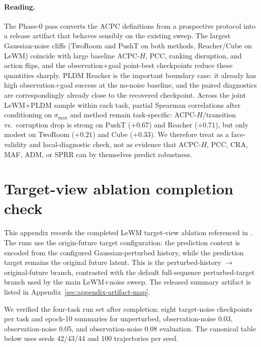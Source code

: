 \documentclass[10pt]{article}
\newcommand{\stdmax}{\ensuremath{\sigma_{\max}}}
\begin{document}
\paragraph{Reading.} The Phase-0 pass converts the ACPC definitions from a prospective protocol into a release artifact that behaves sensibly on the existing sweep. The largest Gaussian-noise cliffs (TwoRoom and PushT on both methods, Reacher/Cube on LeWM) coincide with large baseline ACPC-$H$, PCC, ranking disruption, and action flips, and the observation+goal point-best checkpoints reduce these quantities sharply. PLDM Reacher is the important boundary case: it already has high observation+goal success at the no-noise baseline, and the paired diagnostics are correspondingly already close to the recovered checkpoint. Across the joint LeWM+PLDM sample within each task, partial Spearman correlations after conditioning on \stdmax{} and method remain task-specific: ACPC-$H$/transition vs.\ corruption drop is strong on PushT ($+0.67$) and Reacher ($+0.71$), but only modest on TwoRoom ($+0.21$) and Cube ($+0.33$). We therefore treat  as a face-validity and local-diagnostic check, not as evidence that ACPC-$H$, PCC, CRA, MAF, ADM, or SPRR can by themselves predict robustness.

\section{Target-view ablation completion check}\label{sec:appendix-target-view}

This appendix records the completed LeWM target-view ablation referenced in . The runs use the origin-future target configuration: the prediction context is encoded from the configured Gaussian-perturbed history, while the prediction target remains the original future latent. This is the perturbed-history $\to$ original-future branch, contrasted with the default full-sequence perturbed-target branch used by the main LeWM+noise sweep. The released summary artifact is listed in Appendix~\ref{sec:appendix-artifact-map}.

We verified the four-task run set after completion: eight target-noise checkpoints per task and epoch-10 summaries for unperturbed, observation-noise 0.03, observation-noise 0.05, and observation-noise 0.08 evaluation. The canonical table below uses seeds 42/43/44 and 100 trajectories per seed.
\end{document}
